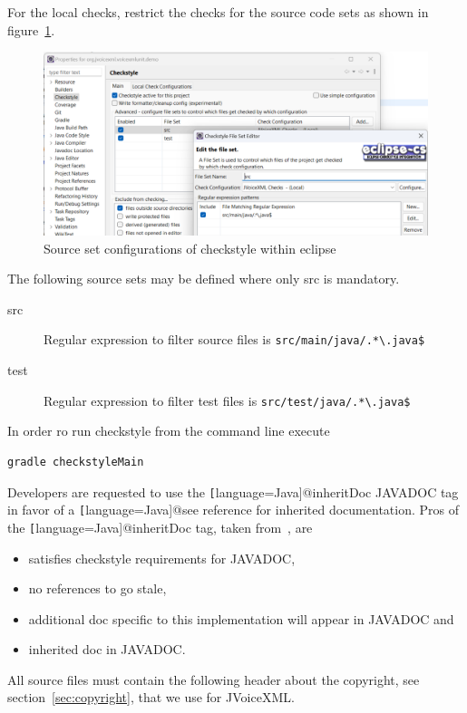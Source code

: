 \documentclass[11pt,a4paper]{article}
\begin{document}
For the local checks, restrict the checks for the source code sets as shown in
figure~\ref{fig:eclipse-project-checkstyle-source-sets}. 
\begin{figure}
\includegraphics[width=\linewidth]{eclipse-project-checkstyle-source-sets.png}
\caption{Source set configurations of checkstyle within eclipse}
\label{fig:eclipse-project-checkstyle-source-sets}
\end{figure}
The following source sets may be defined where only src is mandatory.
\begin{description}
\item[src] Regular expression to filter source files is \verb!src/main/java/.*\.java$!
\item[test] Regular expression to filter test files is \verb!src/test/java/.*\.java$!
\end{description}

In order ro run checkstyle from the command line execute
\begin{lstlisting}
gradle checkstyleMain
\end{lstlisting}


Developers are requested to use the \texttt[language=Java]{@inheritDoc}
JAVADOC tag in favor of a \texttt[language=Java]{@see} reference for inherited documentation.
Pros of the \texttt[language=Java]{@inheritDoc} tag, taken 
from~\cite{tauber:inheritdoc}, are
\begin{itemize}
\item satisfies checkstyle requirements for JAVADOC,
\item no references to go stale,
\item additional doc specific to this implementation will appear in JAVADOC and
\item inherited doc in JAVADOC.
\end{itemize}

All source files must contain the following header about the 
copyright, see section~\ref{sec:copyright}, that we use for JVoiceXML.
\end{document}
